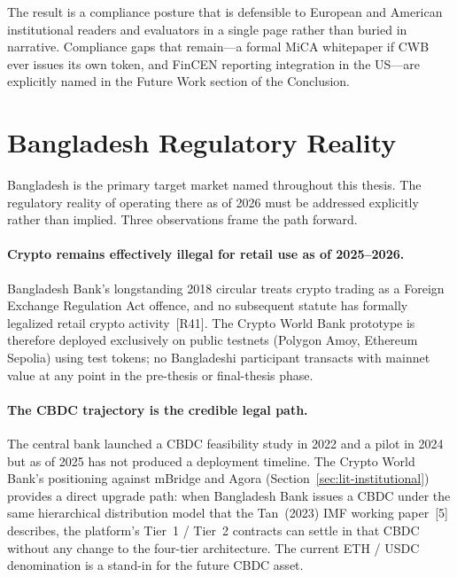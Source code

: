 \documentclass[12pt,a4paper]{report}
\begin{document}
The result is a compliance posture that is defensible to European and American institutional readers and evaluators in a single page rather than buried in narrative. Compliance gaps that remain---a formal MiCA whitepaper if CWB ever issues its own token, and FinCEN reporting integration in the US---are explicitly named in the Future Work section of the Conclusion.

\section{Bangladesh Regulatory Reality}
\label{sec:bangladesh-reg}

Bangladesh is the primary target market named throughout this thesis. The regulatory reality of operating there as of 2026 must be addressed explicitly rather than implied. Three observations frame the path forward.

\paragraph{Crypto remains effectively illegal for retail use as of 2025--2026.}
Bangladesh Bank's longstanding 2018 circular treats crypto trading as a Foreign Exchange Regulation Act offence, and no subsequent statute has formally legalized retail crypto activity~[R41]. The Crypto World Bank prototype is therefore deployed exclusively on public testnets (Polygon Amoy, Ethereum Sepolia) using test tokens; no Bangladeshi participant transacts with mainnet value at any point in the pre-thesis or final-thesis phase.

\paragraph{The CBDC trajectory is the credible legal path.}
The central bank launched a CBDC feasibility study in 2022 and a pilot in 2024 but as of 2025 has not produced a deployment timeline. The Crypto World Bank's positioning against mBridge and Agora (Section~\ref{sec:lit-institutional}) provides a direct upgrade path: when Bangladesh Bank issues a CBDC under the same hierarchical distribution model that the Tan~(2023) IMF working paper~[5] describes, the platform's Tier~1 / Tier~2 contracts can settle in that CBDC without any change to the four-tier architecture. The current ETH / USDC denomination is a stand-in for the future CBDC asset.
\end{document}
